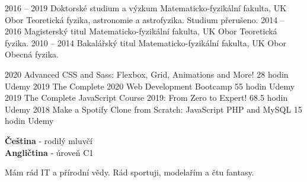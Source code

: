 \documentclass[9pt]{developercv} %
\begin{document}


\begin{entrylist}
	\entry
		{2016 -- 2019}
		{Doktorské studium a výzkum}
		{Matematicko-fyzikální fakulta, UK}
		{Obor Teoretická fyzika, astronomie a astrofyzika. Studium přerušeno.}
	\entry
		{2014 -- 2016}
		{Magisterský titul}
		{Matematicko-fyzikální fakulta, UK}
		{Obor Teoretická fyzika.}
	\entry
		{2010 -- 2014}
		{Bakalářský titul}
		{Matematicko-fyzikální fakulta, UK}
		{Obor Obecná fyzika.}
\end{entrylist}

\begin{entrylist}
	\entry
		{2020}
		{Advanced CSS and Sass: Flexbox, Grid, Animations and More!}
		{28 hodin}
		{Udemy}
	\entry
		{2019}
		{The Complete 2020 Web Development Bootcamp}
		{55 hodin}
		{Udemy}
	\entry
		{2019}
		{The Complete JavaScript Course 2019: From Zero to Expert!}
		{68.5 hodin}
		{Udemy}
	\entry
		{2018}
		{Make a Spotify Clone from Scratch: JavaScript PHP and MySQL}
		{15 hodin}
		{Udemy}
\end{entrylist}


\begin{minipage}[t]{0.5\textwidth}
	\vspace{-\baselineskip} %

	
	\textbf{Čeština} - rodilý mluvčí\\
	\textbf{Angličtina} - úroveň C1
\end{minipage}
\hfill
\begin{minipage}[t]{0.5\textwidth}
	\vspace{-\baselineskip} %
	
	
	Mám rád IT a přírodní vědy. Rád sportuji, modelařím a čtu fantasy.
\end{minipage}
\hfill

\end{document}
